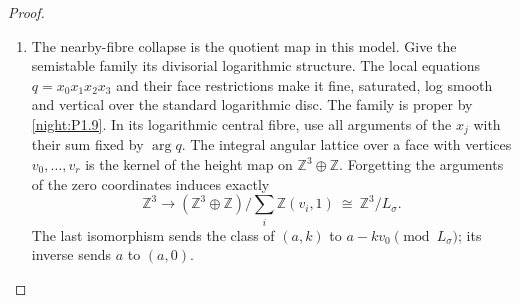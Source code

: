 \documentclass[11pt,a4paper]{article}
\numberwithin{equation}{section}
\theoremstyle{definition}
\begin{document}
\begin{proof}
\begin{enumerate}[label=\arabic*.]
On a shared face put
$\mathcal A_\sigma=2D_\sigma\cap A^\vee$ and choose
$m_0\in\mathcal A_\sigma$.
For $m\in\mathcal A_\sigma$, the difference $m-m_0$ annihilates
$L_\sigma$.  The ratio $Z_m/Z_{m_0}$ is consequently the restriction
of the same character
\[
 \bigl(-(m-m_0),\langle m-m_0,v\rangle\bigr)
       \in(A\oplus\mathbb Z)^\vee
\]
for every vertex $v$ of $\sigma$.  At $C=0$ all deck unit multipliers are one, and the toric gluing
identifies these character functions exactly.  On either component
the restricted moment map is therefore the identical expression
\[
 \frac{\sum_{m\in\mathcal A_\sigma}
       m|\chi^{-(m-m_0)}|^2}
 {2\sum_{m\in\mathcal A_\sigma}|\chi^{-(m-m_0)}|^2}.
\]
The equality persists on every smaller face by restricting the index
set.  Positive character values also agree, so the sections $s_v$
glue on the entire shared orbit closure.  The angular maps are the
displayed quotient homomorphisms $A\to A/L_\sigma$.

The period deck map is $(a,k)\mapsto(a+k\nu,k)$, sending $v$ to
$v+\nu$.  Its component marking is unchanged because
$a+k\nu-k(v+\nu)=a-kv$.
Moreover $\mathcal A_{v+\nu}=\mathcal A_v+2G\nu$; the common
character factor cancels in projective ratios.  Hence
\[
 \mu_{v+\nu}(T_\nu p)=\mu_v(p)+G\nu,
 \qquad s_{v+\nu}(y+G\nu)=T_\nu s_v(y).
\]
These give an explicit well-defined map
\[
 \begin{gathered}
 \mathcal Q=
 \bigl((\mathbb R^3/G\mathbb Z^3)\times
       (\mathbb R^3/\mathbb Z^3)\bigr)/\!\sim
 \longrightarrow C,\\
 [y,\theta]\longmapsto e^{2\pi i\theta}\,s_v(y)
 \quad(y\in P_v).
 \end{gathered}
\]
where over $\operatorname{relint}D_\sigma$ the relation collapses
the subtorus $L_\sigma\otimes(\mathbb R/\mathbb Z)$.
On each stratum the inverse takes its moment value and its angular
character class in $T_A/T_{L_\sigma}$; the latter is obtained by
$z\mapsto z/|z|$ on its nonzero characters.
The map is a continuous bijection, and its source is compact and
$C$ Hausdorff, so it is a homeomorphism.
The angular identity $[y,0]$ gives the continuous section, with
the same face and deck compatibilities just proved.

\item The nearby-fibre collapse is the quotient map in this model.
Give the semistable family its divisorial logarithmic structure.
The local equations $q=x_0x_1x_2x_3$ and their face restrictions
make it fine, saturated, log smooth and vertical over the standard
logarithmic disc.  The family is proper by \cref{night:P1.9}.
In its logarithmic central fibre, use all arguments of the $x_j$
with their sum fixed by $\arg q$.  The integral angular lattice over
a face with vertices $v_0,\ldots,v_r$ is the kernel of the height
map on $\mathbb Z^3\oplus\mathbb Z$.  Forgetting the arguments of
the zero coordinates induces exactly
\[
 \mathbb Z^3\longrightarrow
 (\mathbb Z^3\oplus\mathbb Z)/
       \sum_i\mathbb Z(v_i,1)
 \ \cong\ \mathbb Z^3/L_\sigma.
\]
The last isomorphism sends the class of $(a,k)$ to
$a-kv_0\pmod {L_\sigma}$; its inverse sends $a$ to $(a,0)$.


\end{enumerate}
\end{proof}
\end{document}
